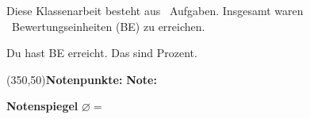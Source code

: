 \begin{coverpages}
\begin{center}
\vspace*{0.7cm}
Diese Klassenarbeit besteht aus \numquestions\ Aufgaben. Insgesamt waren \numpoints\ Bewertungseinheiten (BE) zu erreichen. \smallskip

Du hast \underline{\hspace*{1.5cm}} BE erreicht. Das sind \underline{\hspace*{1.5cm}} Prozent. \medskip


\framebox(350,50){\textbf{Notenpunkte:} \underline{\hspace*{2cm}} \hspace*{1cm} \textbf{Note:} \underline{\hspace*{2cm}}}


\end{center}

\vfill

\newcommand{\tabledef}{G}
\textbf{Notenspiegel}
\vspace*{-0.6cm}
\ifthenelse{\equal{\ntable}{\tabledef}}{\gtable}{\etable}
\centering \vspace*{-1cm}
$\varnothing =$
\end{coverpages}
\restoregeometry